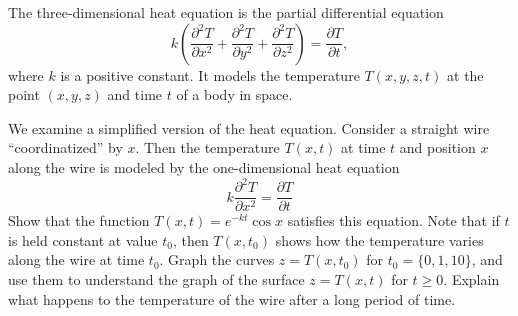 \documentclass[oneperpage]{gsypset}
\begin{document}
	\begin{problem}[2.4.29a]
		The three-dimensional heat equation is the partial differential equation
		\[
			k \left(
					\frac{\partial^2 T}{\partial x^2} +
					\frac{\partial^2 T}{\partial y^2} +
					\frac{\partial^2 T}{\partial z^2}
				\right)
				= \frac{\partial T}{\partial t},
		\]
		where $k$ is a positive constant. 
		It models the temperature $T(x,y,z,t)$ at the point $(x,y,z)$ and time $t$ of a body in space.
		\begin{subproblems}[(a)]
			\subproblem
				We examine a simplified version of the heat equation. 
				Consider a straight wire ``coordinatized'' by $x$. 
				Then the temperature $T(x, t)$ at time $t$ and position $x$ along the wire is modeled by 
				the one-dimensional heat equation
				\[
					k \frac{\partial^2 T}{\partial x^2} = \frac{\partial T}{\partial t}
				\]
				Show that the function $T(x, t) = e^{-kt} \cos x$ satisfies this equation. 
				Note that if $t$ is held constant at value $t_0$, then $T(x , t_0)$ shows how 
				the temperature varies along the wire at time $t_0$. 
				Graph the curves $z = T(x,t_0)$ for $t_0 = \{0,1, 10\}$, 
				and use them to understand the graph of the surface $z = T (x , t)$ for $t \geq 0$. 
				Explain what happens to the temperature of the wire after a long period of time.
				\begin{solution}
					
				\end{solution}
		\end{subproblems}
	\end{problem}
\end{document}
